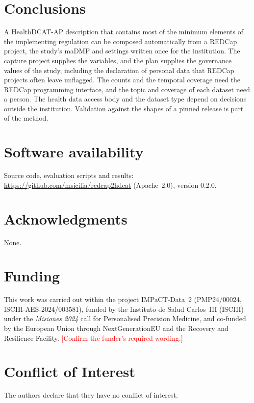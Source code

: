 \documentclass[12pt]{article}
\newcommand{\TBD}[1]{\textcolor{red}{[#1]}}
\newif\ifrevision \revisiontrue
\begin{document}
\section{Conclusions}

A HealthDCAT-AP description that contains most of the minimum elements of the
implementing regulation can be composed automatically from a REDCap project, the study's
maDMP and settings written once for the institution. The capture project supplies the
variables, and the plan supplies the governance values of the study, including the
declaration of personal data that REDCap projects often leave unflagged. The counts and
the temporal coverage need the REDCap programming interface, and the topic and coverage
of each dataset need a person. The health data access body and the dataset type depend
on decisions outside the institution.
Validation against the shapes of a pinned release is part of the method.

\section*{Software availability}
Source code, evaluation scripts and results: \url{https://github.com/msicilia/redcap2hdcat}
(Apache~2.0),
version 0.2.0.

\section*{Acknowledgments}
None.

\section*{Funding}
This work was carried out within the project IMPaCT-Data~2 (PMP24/00024,
ISCIII-AES-2024/003581), funded by the Instituto de Salud Carlos~III (ISCIII) under the
\emph{Misiones 2024} call for Personalised Precision Medicine, and co-funded by the
European Union through NextGenerationEU and the Recovery and Resilience Facility.
\TBD{Confirm the funder's required wording.}

\section*{Conflict of Interest}
The authors declare that they have no conflict of interest.

\newpage



\ifrevision\else
\newpage
\section*{Figure captions}

\refstepcounter{figure}\label{fig:architecture}%
\noindent\textbf{Figure 1.} \FigOneCaption

\newpage
\section*{Tables}



\fi
\end{document}
